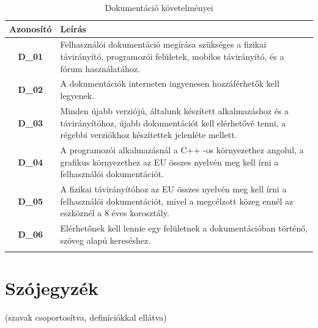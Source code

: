 \documentclass{article}
\begin{document}
\begingroup
\centering
\begin{longtable}{|c|p{14cm}|}
\hline
\textbf{Azonosító} & \textbf{Leírás}        \\ 
\hline
       \textbf{D\_01}  & Felhasználói dokumentáció megírása szükséges a fizikai távirányító, programozói felületek, mobilos távirányító, és a fórum használatához. \\\hline
       \textbf{D\_02}  & A dokumentációk interneten ingyenesen hozzáférhetők kell legyenek. \\\hline
       \textbf{D\_03}  & Minden újabb verziójú, általunk készített alkalmazáshoz és a távirányítóhoz, újabb dokumentációt kell elérhetővé tenni, a régebbi verziókhoz készítettek jelenléte mellett. \\\hline
       \textbf{D\_04}  & A programozói alkalmazásnál a C++ -os környezethez angolul, a grafikus környezethez az EU összes nyelvén meg kell írni a felhasználói dokumentációt. \\\hline
       \textbf{D\_05}  & A fizikai távirányítóhoz az EU összes nyelvén meg kell írni a felhasználói dokumentációt, mivel a megcélzott közeg ennél az eszköznél a 8 éves korosztály. \\\hline
       \textbf{D\_06}  & Elérhetőnek kell lennie egy felületnek a dokumentációban történő, szöveg alapú kereséshez. \\\hline
\hline
\caption{Dokumentáció követelményei}
\end{longtable}
\endgroup


\pagebreak
\section{Szójegyzék}

(szavak csoportosítva, definíciókkal ellátva)
\end{document}
